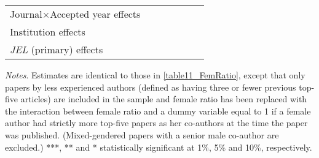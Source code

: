 \begin{table}
\begin{threeparttable}
\begin{tabular}{p{3.78cm}S@{}S@{}S@{}S@{}S@{}S@{}}
            Journal\(\times\)Accepted year effects &               &               &           {}   &               &               &           {}   \\
            Institution effects           &           {}   &           {}   &           {}   &           {}   &           {}   &           {}   \\
            \textit{JEL} (primary) effects&               &               &               &           {}   &           {}   &           {}   \\
            \bottomrule
        \end{tabular}
        \begin{tablenotes}
            \tiny
            \item \textit{Notes}. Estimates are identical to those in \autoref{table11_FemRatio}, except that only papers by less experienced authors (defined as having three or fewer previous top-five articles) are included in the sample and female ratio has been replaced with the interaction between female ratio and a dummy variable equal to 1 if a female author had strictly more top-five papers as her co-authors at the time the paper was published. (Mixed-gendered papers with a senior male co-author are excluded.) ***, ** and * statistically significant at 1\%, 5\% and 10\%, respectively.
        \end{tablenotes}
    \end{threeparttable}
\end{table}